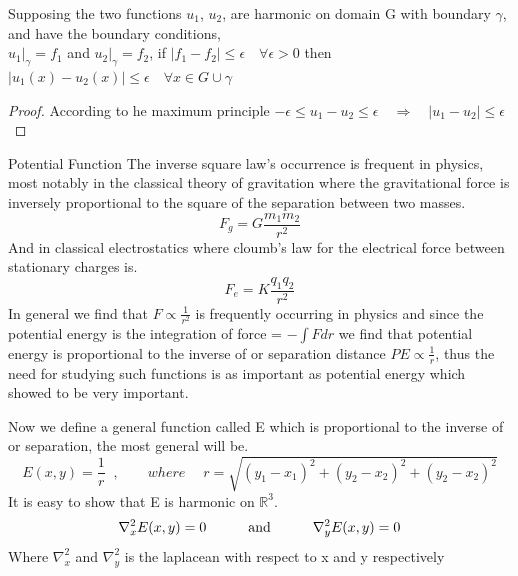\documentclass[]{article}
\begin{document}
\begin{theorem}
    Supposing the two functions $u_1$, $u_2$, are harmonic on domain G with boundary $\gamma$, and have the boundary conditions, 
    \\
    $u_1|_\gamma = f_1$ and $u_2|_\gamma = f_2$, if $|f_1 - f_2| \leq \epsilon  \quad \forall \epsilon > 0$ then $|u_1(x) - u_2(x)| \leq \epsilon \quad \forall x \in G \cup \gamma $
\end{theorem}
\begin{proof}
    According to he maximum principle $-\epsilon \leq u_1 - u_2 \leq \epsilon \quad \Rightarrow \quad |u_1 - u_2| \leq \epsilon$
\end{proof}
\begin{enrichment*}{Potential Function}
    The inverse square law's occurrence is frequent in physics, most notably in the classical theory of gravitation where the gravitational force is inversely proportional to the square of the separation between two masses.
\[
    F_g = G\frac{m_1 m_2}{r^2}    
\]
And in classical electrostatics where cloumb's law for the electrical force between stationary charges is.
\[
    F_e = K\frac{q_1 q_2}{r^2}    
\]
In general we find that $F \propto \frac{1}{r^2}$ is frequently occurring in physics and since the potential energy is the integration of force
= $\displaystyle -\int F dr$ we find that potential energy is proportional to the inverse of or separation distance $PE \propto \frac{1}{r}$, thus the need for studying such functions is as important as potential energy which showed to be very important.
\par
Now we define a general function called E which is proportional to the inverse of or separation, the most general will be.
\[
    E(x,y) = \frac{1}{r}\;\;,\quad\quad where\quad\; r = \sqrt{(y_1-x_1)^2 + (y_2-x_2)^2 + (y_2-x_2)^2}    
\]
It is easy to show that E is harmonic on $\mathbb{R}^3$.
\[
    \nabla_{x}^{2} E(x,y) = 0 \quad\quad\quad \text{and} \quad\quad\quad \nabla_{y}^{2} E(x,y) = 0    
\]
Where $\nabla_{x}^{2}$ and $\nabla_{y}^{2}$ is the laplacean with respect to x and y respectively
\end{enrichment*}

\setcounter{equation}{0}
\end{document}
